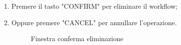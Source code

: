 \begin{enumerate}
\begin{enumerate}
		\item Premere il tasto "CONFIRM" per eliminare il workflow;
		\item Oppure premere "CANCEL" per annullare l'operazione.
		\begin{figure}[!ht]
			\centering
			\caption{Finestra conferma eliminazione}
		\end{figure}
	\end{enumerate}
	\begin{figure}[!ht]
		\centering

\end{figure}
\end{enumerate}
